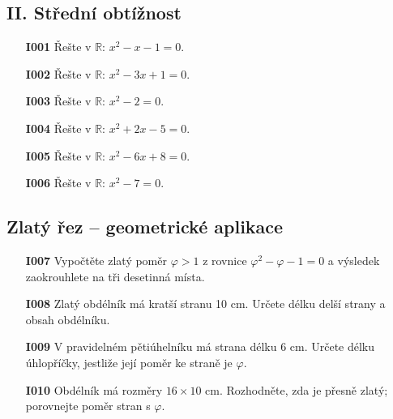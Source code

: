 \documentclass[11pt,a4paper]{article}
\begin{document}
\subsection*{II. Střední obtížnost}
\begin{enumerate}[label={},itemsep=5pt]
\item[\textbf{I001}] Řešte v $\mathbb R$: $x^{2} - x - 1=0$.
\item[\textbf{I002}] Řešte v $\mathbb R$: $x^{2} - 3x + 1=0$.
\item[\textbf{I003}] Řešte v $\mathbb R$: $x^{2} - 2=0$.
\item[\textbf{I004}] Řešte v $\mathbb R$: $x^{2} + 2x - 5=0$.
\item[\textbf{I005}] Řešte v $\mathbb R$: $x^{2} - 6x + 8=0$.
\item[\textbf{I006}] Řešte v $\mathbb R$: $x^{2} - 7=0$.
\end{enumerate}
\subsection*{Zlatý řez -- geometrické aplikace}
\begin{enumerate}[label={},itemsep=8pt]
\item[\textbf{I007}] Vypočtěte zlatý poměr $\varphi>1$ z rovnice $\varphi^2-\varphi-1=0$ a výsledek zaokrouhlete na tři desetinná místa.
\item[\textbf{I008}] Zlatý obdélník má kratší stranu 10 cm. Určete délku delší strany a obsah obdélníku.
\item[\textbf{I009}] V pravidelném pětiúhelníku má strana délku 6 cm. Určete délku úhlopříčky, jestliže její poměr ke straně je $\varphi$.
\item[\textbf{I010}] Obdélník má rozměry $16\times10$ cm. Rozhodněte, zda je přesně zlatý; porovnejte poměr stran s $\varphi$.
\end{enumerate}
\end{document}
